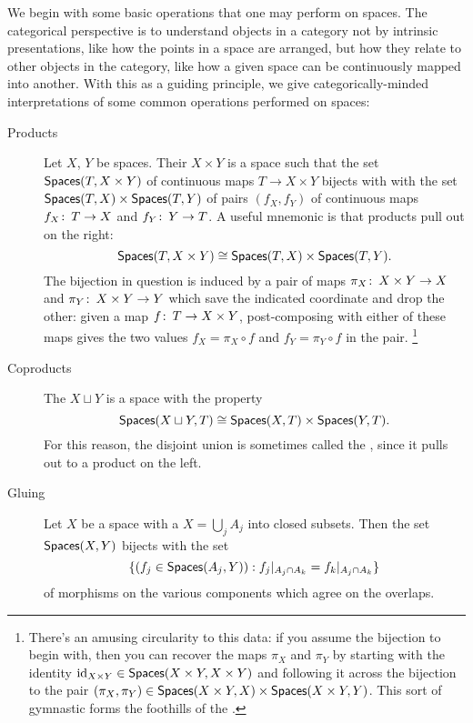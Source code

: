 We begin with some basic operations that one may perform on spaces.
The categorical perspective is to understand objects in a category not by intrinsic presentations, like how the points in a space are arranged, but how they relate to other objects in the category, like how a given space can be continuously mapped into another.
With this as a guiding principle, we give categorically-minded interpretations of some common operations performed on spaces:
\begin{description}
    \item[Products]
    Let $X$, $Y$ be spaces.
    Their  $X \times Y$ is a space such that the set $\mathsf{Spaces}(T, X \times Y)$ of continuous maps $T \to X \times Y$ bijects with with the set $\mathsf{Spaces}(T, X) \times \mathsf{Spaces}(T, Y)$ of pairs $(f_X, f_Y)$ of continuous maps $f_X\colon\thinspace T \to X$ and $f_Y\colon\thinspace Y \to T$.
    A useful mnemonic is that products pull out on the right: \[\mathsf{Spaces}(T, X \times Y) \cong \mathsf{Spaces}(T, X) \times \mathsf{Spaces}(T, Y).\]
    The bijection in question is induced by a pair of maps $\pi_X\colon\thinspace X \times Y \to X$ and $\pi_Y\colon\thinspace X \times Y \to Y$ which save the indicated coordinate and drop the other: given a map $f\colon\thinspace T \to X \times Y$, post-composing with either of these maps gives the two values $f_X = \pi_X \circ f$ and $f_Y = \pi_Y \circ f$ in the pair.%
    \footnote{There's an amusing circularity to this data: if you assume the bijection to begin with, then you can recover the maps $\pi_X$ and $\pi_Y$ by starting with the identity $\operatorname{id}_{X \times Y} \in \mathsf{Spaces}(X \times Y, X \times Y)$ and following it across the bijection to the pair $(\pi_X, \pi_Y) \in \mathsf{Spaces}(X \times Y, X) \times \mathsf{Spaces}(X \times Y, Y)$.
    This sort of gymnastic forms the foothills of the .}
    \item[Coproducts]
    The  $X \sqcup Y$ is a space with the property \[\mathsf{Spaces}(X \sqcup Y, T) \cong \mathsf{Spaces}(X, T) \times \mathsf{Spaces}(Y, T).\]
    For this reason, the disjoint union is sometimes called the , since it pulls out to a product on the left.
    \item[Gluing]
    Let $X$ be a space with a  $X = \bigcup_j A_j$ into closed subsets.
    Then the set $\mathsf{Spaces}(X, Y)$ bijects with the set \[\{(f_j \in \mathsf{Spaces}(A_j, Y)) : f_j|_{A_j \cap A_k} = f_k|_{A_j \cap A_k}\}\] of morphisms on the various components which agree on the overlaps.

\end{description}
